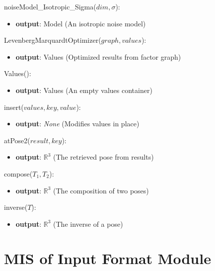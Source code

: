 \documentclass[12pt, titlepage]{article}
\begin{document}
\noindent noiseModel\_Isotropic\_Sigma($dim, \sigma$):
\begin{itemize}
    \item \textbf{output}: Model (An isotropic noise model)
\end{itemize}

\noindent LevenbergMarquardtOptimizer($graph, values$):
\begin{itemize}
    \item \textbf{output}: Values (Optimized results from factor graph)
\end{itemize}

\noindent Values():
\begin{itemize}
    \item \textbf{output}: Values (An empty values container)
\end{itemize}

\noindent insert($values, key, value$):
\begin{itemize}
    \item \textbf{output}: \textit{None} (Modifies values in place)
\end{itemize}

\noindent atPose2($result, key$):
\begin{itemize}
    \item \textbf{output}: $\mathbb{R}^3$ (The retrieved pose from results)
\end{itemize}

\noindent compose($T_1, T_2$):
\begin{itemize}
    \item \textbf{output}: $\mathbb{R}^3$ (The composition of two poses)
\end{itemize}

\noindent inverse($T$):
\begin{itemize}
    \item \textbf{output}: $\mathbb{R}^3$ (The inverse of a pose)
\end{itemize}



\newpage

\section{MIS of Input Format Module} \label{M_Input} 
\end{document}
